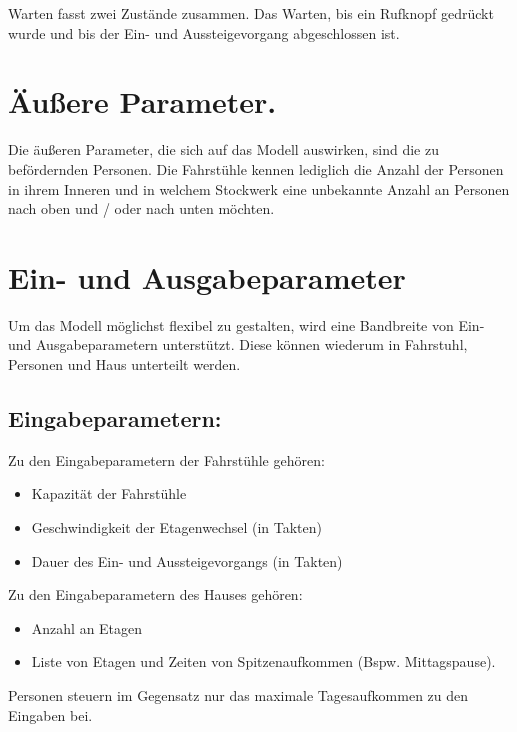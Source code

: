 Warten fasst zwei Zustände zusammen. Das Warten, bis ein Rufknopf
gedrückt wurde und bis der Ein- und Aussteigevorgang abgeschlossen ist.

\hypertarget{uxe4uuxdfere-parameter.}{%
\section{Äußere Parameter.}\label{uxe4uuxdfere-parameter.}}

Die äußeren Parameter, die sich auf das Modell auswirken, sind die zu
befördernden Personen. Die Fahrstühle kennen lediglich die Anzahl der
Personen in ihrem Inneren und in welchem Stockwerk eine unbekannte
Anzahl an Personen nach oben und / oder nach unten möchten.

\hypertarget{ein--und-ausgabeparameter}{%
\section{Ein- und Ausgabeparameter}\label{ein--und-ausgabeparameter}}

Um das Modell möglichst flexibel zu gestalten, wird eine Bandbreite von
Ein- und Ausgabeparametern unterstützt. Diese können wiederum in
Fahrstuhl, Personen und Haus unterteilt werden.

\hypertarget{eingabeparametern}{%
\subsection{Eingabeparametern:}\label{eingabeparametern}}

Zu den Eingabeparametern der Fahrstühle gehören:

\begin{itemize}
\tightlist
\item
  Kapazität der Fahrstühle
\item
  Geschwindigkeit der Etagenwechsel (in Takten)
\item
  Dauer des Ein- und Aussteigevorgangs (in Takten)
\end{itemize}

Zu den Eingabeparametern des Hauses gehören:

\begin{itemize}
\tightlist
\item
  Anzahl an Etagen
\item
  Liste von Etagen und Zeiten von Spitzenaufkommen (Bspw. Mittagspause).
\end{itemize}

Personen steuern im Gegensatz nur das maximale Tagesaufkommen zu den
Eingaben bei.

